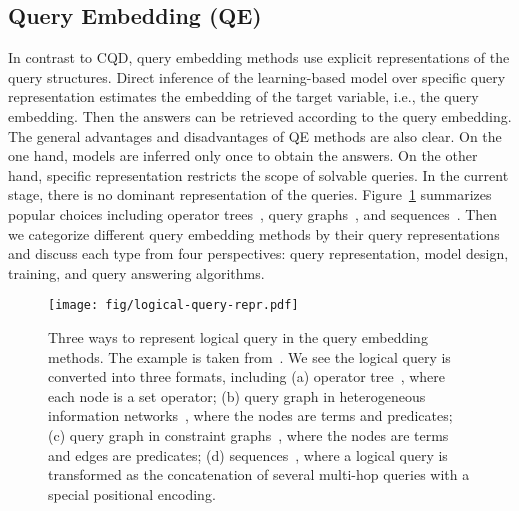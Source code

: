 \documentclass[11pt]{article}
\begin{document}
\subsection{Query Embedding (QE)}\label{sec:qe}
In contrast to CQD, query embedding methods use explicit representations of the query structures. Direct inference of the learning-based model over specific query representation estimates the embedding of the target variable, i.e., the query embedding. Then the answers can be retrieved according to the query embedding.
The general advantages and disadvantages of QE methods are also clear. On the one hand, models are inferred only once to obtain the answers. On the other hand, specific representation restricts the scope of solvable queries.
In the current stage, there is no dominant representation of the queries. Figure~\ref{fig:query-representation} summarizes popular choices including operator trees~\cite{Wang2021BenchmarkingCombinatorial}, query graphs~\cite{Liu2022MaskReason}, and sequences~\cite{Kotnis2021AnsweringComplex}.
Then we categorize different query embedding methods by their query representations and discuss each type from four perspectives: query representation, model design, training, and query answering algorithms.

\begin{figure}[t]
\centering
    \texttt{[image: fig/logical-query-repr.pdf]}
    \caption{Three ways to represent logical query in the query embedding methods. The example is taken from~\cite{Kotnis2021AnsweringComplex}. We see the logical query is converted into three formats, including (a) operator tree~\cite{Wang2021BenchmarkingCombinatorial}, where each node is a set operator; (b) query graph in heterogeneous information networks~\cite{Liu2022MaskReason}, where the nodes are terms and predicates; (c) query graph in constraint graphs~\cite{Daza2020MessagePassing,LMPNN}, where the nodes are terms and edges are predicates; (d) sequences~\cite{Kotnis2021AnsweringComplex}, where a logical query is transformed as the concatenation of several multi-hop queries with a special positional encoding.}\label{fig:query-representation}
\end{figure}
\end{document}
